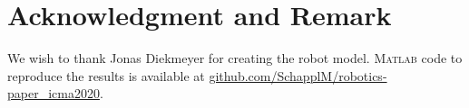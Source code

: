 
\section*{Acknowledgment and Remark}


We wish to thank Jonas Diekmeyer for creating the robot model.
%
\textsc{Matlab} code to reproduce the results is available at  
%
\url{github.com/SchapplM/robotics-paper_icma2020}.

